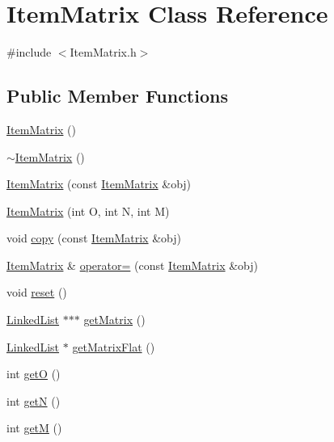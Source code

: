 \hypertarget{classItemMatrix}{\section{Item\-Matrix Class Reference}
\label{classItemMatrix}
}


{\ttfamily \#include $<$Item\-Matrix.\-h$>$}

\subsection*{Public Member Functions}
\begin{DoxyCompactItemize}
\item 
\hyperlink{classItemMatrix_a68ef432c2980e7c1ce8b683b2ae5c0ab}{Item\-Matrix} ()
\item 
\hyperlink{classItemMatrix_afea08e73553deb9a380f991db13dfb8a}{$\sim$\-Item\-Matrix} ()
\item 
\hyperlink{classItemMatrix_a35f712d777c4bc293435944c57311d81}{Item\-Matrix} (const \hyperlink{classItemMatrix}{Item\-Matrix} \&obj)
\item 
\hyperlink{classItemMatrix_a34829071decf583ec414ccf41776edae}{Item\-Matrix} (int O, int N, int M)
\item 
void \hyperlink{classItemMatrix_a740f6288b3c2df24ecac8243ca7cb9c1}{copy} (const \hyperlink{classItemMatrix}{Item\-Matrix} \&obj)
\item 
\hyperlink{classItemMatrix}{Item\-Matrix} \& \hyperlink{classItemMatrix_a967e74cda2ddfabc9a2de8e01c14bafe}{operator=} (const \hyperlink{classItemMatrix}{Item\-Matrix} \&obj)
\item 
void \hyperlink{classItemMatrix_a335cf037ed4ab6a6c2ee107b17ecff44}{reset} ()
\item 
\hyperlink{classLinkedList}{Linked\-List} $\ast$$\ast$$\ast$ \hyperlink{classItemMatrix_a541567ed5902b422c1e6f54977fd0567}{get\-Matrix} ()
\item 
\hyperlink{classLinkedList}{Linked\-List} $\ast$ \hyperlink{classItemMatrix_af6560d8a1518b86b549166084a1d7ffa}{get\-Matrix\-Flat} ()
\item 
int \hyperlink{classItemMatrix_ad20ebddd51c2c597e6fb77ebadddd1a2}{get\-O} ()
\item 
int \hyperlink{classItemMatrix_a62a080689838d80ca501fe492d82a54b}{get\-N} ()
\item 
int \hyperlink{classItemMatrix_ad8f788c29401efd06e9019ff320a765b}{get\-M} ()
\end{DoxyCompactItemize}


